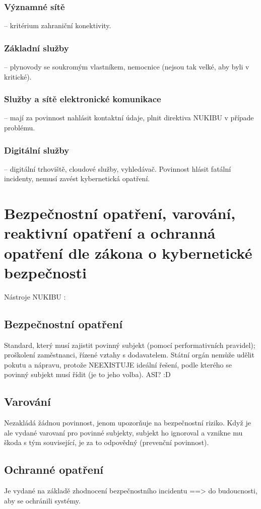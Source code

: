 \subsubsection*{Významné sítě} -- kritérium zahraniční konektivity.
\subsubsection*{Základní služby} -- plynovody se soukromým vlastníkem, nemocnice (nejsou tak velké, aby byli v kritické).
\subsubsection*{Služby a sítě elektronické komunikace} -- mají za povinnost nahlásit kontaktní údaje, plnit direktiva NUKIBU v případe problému.
\subsubsection*{Digitální služby} -- digitální trhoviště, cloudové služby, vyhledávač. Povinnost hlásit fatální incidenty, nemusí zavést kybernetická opatření.

\clearpage
\section{Bezpečnostní opatření, varování, reaktivní opatření a ochranná opatření dle zákona o kybernetické bezpečnosti}
Nástroje NUKIBU :
\subsection*{Bezpečnostní opatření}
Standard, který musí zajistit povinný subjekt (pomocí performativních pravidel); proškolení zaměstnanci, řízené vztahy s dodavatelem. Státní orgán nemůže udělit pokutu a nápravu, protože NEEXISTUJE ideální řešení, podle kterého se povinný subjekt musí řídit (je to jeho volba). ASI? :D

\subsection*{Varování}
Nezakládá žádnou povinnost, jenom upozorňuje na bezpečnostní riziko. Když je ale vydané varovaní pro povinné subjekty, subjekt ho ignoroval a vznikne mu škoda s tým související, je za to odpovědný (prevenční povinnost).

\subsection*{Ochranné opatření}
Je vydané na základě zhodnocení bezpečnostního incidentu ==> do budoucnosti, aby se ochránili systémy.

